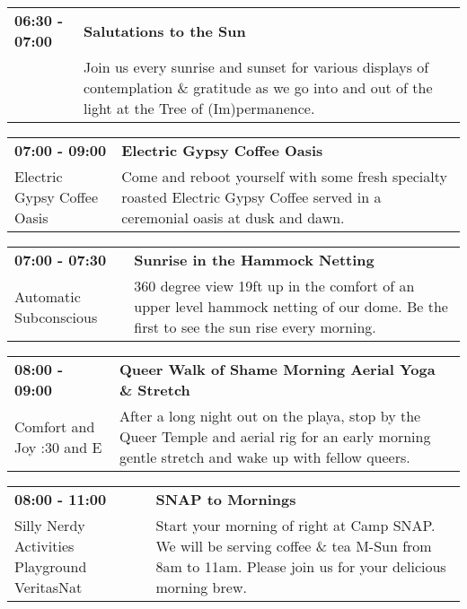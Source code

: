 \begin{tabular}{ p{1in} p{2.2in} }
    \textbf{06:30 - 07:00} & \textbf{Salutations to the Sun} \\
    ~ \newline  & Join us every sunrise and sunset for various displays of contemplation \& gratitude as we go into and out of the light at the Tree of (Im)permanence. \\
    \hline 
\end{tabular}
    
\begin{tabular}{ p{1in} p{2.2in} }
    \textbf{07:00 - 09:00} & \textbf{Electric Gypsy Coffee Oasis} \\
    Electric Gypsy Coffee Oasis \newline  & Come and reboot yourself with some fresh specialty roasted Electric Gypsy Coffee served in a ceremonial oasis at dusk and dawn. \\
    \hline 
\end{tabular}
    
\begin{tabular}{ p{1in} p{2.2in} }
    \textbf{07:00 - 07:30} & \textbf{Sunrise in the Hammock Netting} \\
    Automatic Subconscious \newline  & 360 degree view 19ft up in the comfort of an upper level hammock netting of our dome. Be the first to see the sun rise every morning. \\
    \hline 
\end{tabular}
    
\begin{tabular}{ p{1in} p{2.2in} }
    \textbf{08:00 - 09:00} & \textbf{Queer Walk of Shame Morning Aerial Yoga \& Stretch} \\
    Comfort and Joy \newline 7:30 and E & After a long night out on the playa, stop by the Queer Temple and aerial rig for an early morning gentle stretch and wake up with fellow queers. \\
    \hline 
\end{tabular}
    
\begin{tabular}{ p{1in} p{2.2in} }
    \textbf{08:00 - 11:00} & \textbf{SNAP to Mornings} \\
    Silly Nerdy Activities Playground \newline VeritasNat & Start your morning of right at Camp SNAP. We will be serving coffee \& tea M-Sun from 8am to 11am. Please join us for your delicious morning brew. \\
    \hline 
\end{tabular}
    
